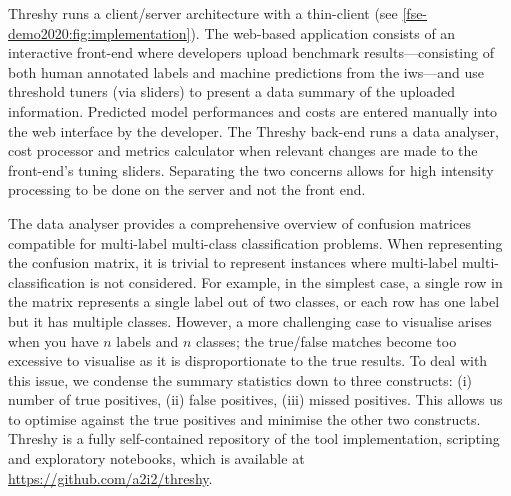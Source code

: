 




Threshy runs a client/server architecture with a thin-client (see \cref{fse-demo2020:fig:implementation}). The web-based application consists of an interactive front-end where developers upload benchmark results---consisting of both human annotated labels and machine predictions from the \gls{iws}---and use threshold tuners (via sliders) to present a data summary of the uploaded information. Predicted model performances and costs are entered manually into the web interface by the developer. The Threshy back-end runs a data analyser, cost processor and metrics calculator when relevant changes are made to the front-end's tuning sliders. Separating the two concerns allows for high intensity processing to be done on the server and not the front end.

The data analyser provides a comprehensive overview of confusion matrices compatible for multi-label multi-class classification problems. When representing the confusion matrix, it is trivial to represent instances where multi-label multi-classification is not considered. For example, in the simplest case, a single row in the matrix represents a single label out of two classes, or each row has one label but it has multiple classes. However, a more challenging case to visualise arises when you have $n$ labels and $n$ classes; the true/false matches become too excessive to visualise as it is disproportionate to the true results.  To deal with this issue, we condense the summary statistics down to three constructs: (i) number of true positives, (ii) false positives, (iii) missed positives. This allows us to optimise against the true positives and minimise the other two constructs. 
Threshy is a fully self-contained repository of the tool implementation, scripting and exploratory notebooks, which is available at \url{https://github.com/a2i2/threshy}.



